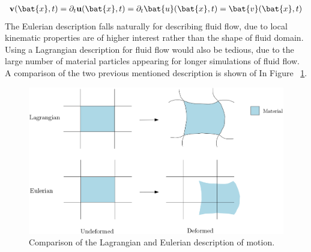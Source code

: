 \begin{align*}
\textbf{v}(\bat{x},t) = \partial_t \mathbf{u}(\bat{x},t) = \partial_t \bat{u}(\bat{x},t) = \bat{v}(\bat{x},t)
\end{align*}
The Eulerian description falls naturally for describing fluid flow, due to local kinematic properties are of higher interest rather than the shape of fluid domain. Using a Lagrangian description for fluid flow would also be tedious, due to the large number of material particles appearing for longer simulations of fluid flow. A comparison of the two previous mentioned description is shown of In Figure ~\ref{fig:lageul}.
\begin{figure}[h!]
  \centering
    \includegraphics[scale=0.28]{./Fig/lageul.png}
      \caption{Comparison of the Lagrangian and Eulerian description of motion.}
      \label{fig:lageul}
\end{figure}
 \newpage
